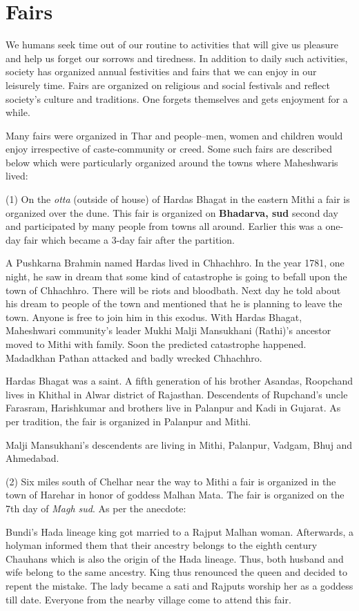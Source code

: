 \chapter{Fairs}
We humans seek time out of our routine to activities that will give us pleasure
and help us forget our sorrows and tiredness. In addition to daily such
activities, society has organized annual festivities and fairs that we can
enjoy in our leisurely time. Fairs are organized on religious and social
festivals and reflect society's culture and traditions. One forgets themselves
and gets enjoyment for a while.

Many fairs were organized in Thar and people--men, women and children would
enjoy irrespective of caste-community or creed. Some such fairs are described
below which were particularly organized around the towns where Maheshwaris
lived:

(1) On the \textit{otta} (outside of house) of Hardas Bhagat in the eastern
Mithi a fair is organized over the dune. This fair is organized on
\textbf{Bhadarva, sud} second day and participated by many people from towns
all around. Earlier this was a one-day fair which became a 3-day fair after the
partition.

A Pushkarna Brahmin named Hardas lived in Chhachhro. In the year 1781, one
night, he saw in dream that some kind of catastrophe is going to befall upon
the town of Chhachhro. There will be riots and bloodbath. Next day he told
about his dream to people of the town and mentioned that he is planning to
leave the town. Anyone is free to join him in this exodus. With Hardas Bhagat,
Maheshwari community's leader Mukhi Malji Mansukhani (Rathi)'s ancestor moved
to Mithi with family. Soon the predicted catastrophe happened. Madadkhan Pathan
attacked and badly wrecked Chhachhro.

Hardas Bhagat was a saint. A fifth generation of his brother Asandas, Roopchand
lives in Khithal in Alwar district of Rajasthan. Descendents of Rupchand's
uncle Farasram, Harishkumar and brothers live in Palanpur and Kadi in Gujarat.
As per tradition, the fair is organized in Palanpur and Mithi.

Malji Mansukhani's descendents are living in Mithi, Palanpur, Vadgam, Bhuj and
Ahmedabad.

(2) Six miles south of Chelhar near the way to Mithi a fair is organized in the
town of Harehar in honor of goddess Malhan Mata. The fair is organized on the
7th day of \textit{Magh sud}. As per the anecdote:

Bundi's Hada lineage king got married to a Rajput Malhan woman. Afterwards, a
holyman informed them that their ancestry belongs to the eighth century
Chauhans which is also the origin of the Hada lineage. Thus, both husband and
wife belong to the same ancestry. King thus renounced the queen and decided to
repent the mistake. The lady became a sati and Rajputs worship her as a goddess
till date. Everyone from the nearby village come to attend this fair.

